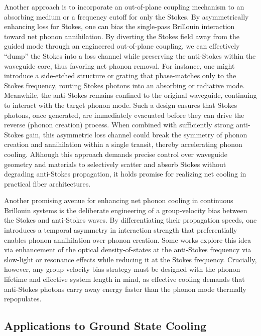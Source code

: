 Another approach is to incorporate an out-of-plane coupling mechanism to an absorbing medium or a frequency cutoff for only the Stokes. By asymmetrically enhancing loss for Stokes, one can bias the single-pass Brillouin interaction toward net phonon annihilation. By diverting the Stokes field away from the guided mode through an engineered out-of-plane coupling, we can effectively “dump” the Stokes into a loss channel while preserving the anti-Stokes within the waveguide core, thus favoring net phonon removal. For instance, one might introduce a side-etched structure or grating that phase-matches only to the Stokes frequency, routing Stokes photons into an absorbing or radiative mode. Meanwhile, the anti-Stokes remains confined to the original waveguide, continuing to interact with the target phonon mode. Such a design ensures that Stokes photons, once generated, are immediately evacuated before they can drive the reverse (phonon creation) process. When combined with sufficiently strong anti-Stokes gain, this asymmetric loss channel could break the symmetry of phonon creation and annihilation within a single transit, thereby accelerating phonon cooling. Although this approach demands precise control over waveguide geometry and materials to selectively scatter and absorb Stokes without degrading anti-Stokes propagation, it holds promise for realizing net cooling in practical fiber architectures.

Another promising avenue for enhancing net phonon cooling in continuous Brillouin systems is the deliberate engineering of a group-velocity bias between the Stokes and anti-Stokes waves. By differentiating their propagation speeds, one introduces a temporal asymmetry in interaction strength that preferentially enables phonon annihilation over phonon creation. Some works explore this idea via enhancement of the optical density-of-states at the anti-Stokes frequency via slow-light or resonance effects while reducing it at the Stokes frequency. \cite{kim2017role, bahl2012observation} Crucially, however, any group velocity bias strategy must be designed with the phonon lifetime and effective system length in mind, as effective cooling demands that anti-Stokes photons carry away energy faster than the phonon mode thermally repopulates.

\subsection{Applications to Ground State Cooling}
\label{Cooling:subsec:ApplicationstoGroundStateCooling}

